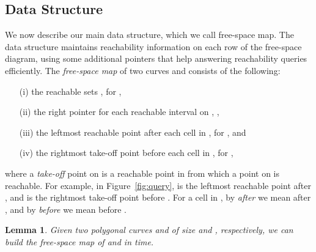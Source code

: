 \documentclass[12pt]{dalthesis}
\newtheorem{lemma}[theorem]{Lemma}
\newcommand{\REM}[1]{}
\newcommand{\fs}{free-space }
\begin{document}
\REM{
\begin{algorithm} [h]
\caption {\sc Compute-Pointers} 
\label{alg:pointers}
\algsetup{indent=1.5em}
\begin{algorithmic}[1]
	\vspace{0.5em}
	\STATE let  orthogonal projection of  onto  
	\STATE 
	\STATE 
	\IF {}
		\STATE  
	\ENDIF
	\STATE set  
\end{algorithmic}
\end{algorithm}
}
\newpage
\subsection{Data Structure}

We now describe our main data structure, 
which we call \fs map.
The data structure maintains reachability information 
on each row of the \fs diagram, using some additional
pointers that help answering reachability queries efficiently. 
The \emph{\fs map} of two curves  and 
consists of the following:
\begin{itemize}
\item[(i)] the reachable sets , for ,
	\item[(ii)] the right pointer  for each reachable interval  on , ,
	\item[(iii)] the leftmost reachable point after each cell in , for , and
	\item[(iv)] the rightmost take-off point before each cell in , for ,
\end{itemize}
where a \emph{take-off} point on  is a reachable point in 
from which a point on  is reachable.
For example, in Figure~\ref{fig:query},  is the leftmost reachable point after ,
and  is the rightmost take-off point before .
For a cell  in , by \emph{after}  we mean after ,
and by \emph{before}  we mean before .

\begin{lemma} \label{lemma:map}
	Given two polygonal curves  and  of size  and , respectively,
	we can build the \fs map of  and  in  time.
\end{lemma}
\end{document}
